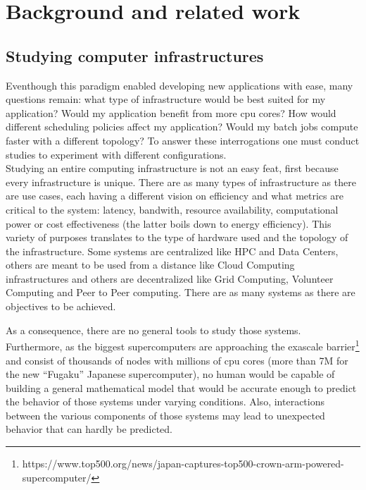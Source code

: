 \chapter{Background and related work}


\section{Studying computer infrastructures} \label{study-computing-infra}

Eventhough this paradigm enabled developing new applications with ease, many
questions remain: what type of infrastructure would be best suited for my
application? Would my application benefit from more cpu cores? How would
different scheduling policies affect my application? Would my batch jobs
compute faster with a different topology? To answer these interrogations one
must conduct studies to experiment with different configurations.\\

Studying an entire computing infrastructure is not an easy feat, first because
every infrastructure is unique. There are as many types of infrastructure as
there are use cases, each having a different vision on efficiency and what
metrics are critical to the system: latency, bandwith, resource availability,
computational power or cost effectiveness (the latter boils down to energy
efficiency). This variety of purposes translates to the type of hardware used
and the topology of the infrastructure. Some systems are centralized like HPC
and Data Centers, others are meant to be used from a distance like Cloud
Computing infrastructures and others are decentralized like Grid Computing,
Volunteer Computing and Peer to Peer computing. There are as many systems as
there are objectives to be achieved.

As a consequence, there are no general tools to study those systems.
Furthermore, as the biggest supercomputers are approaching the exascale
barrier\footnote{https://www.top500.org/news/japan-captures-top500-crown-arm-powered-supercomputer/}
and consist of thousands of nodes with millions of cpu cores (more than 7M for
the new ``Fugaku'' Japanese supercomputer), no human would be capable of
building a general mathematical model that would be accurate enough to predict
the behavior of those systems under varying conditions. Also, interactions
between the various components of those systems may lead to unexpected
behavior\cite{10.1007/978-3-319-09873-9_12} that can hardly be predicted.

